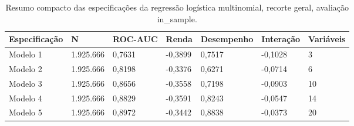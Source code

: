 \begin{table}
\caption{Resumo compacto das especificações da regressão logística multinomial, recorte geral, avaliação in_sample.}
\label{tab:tabela_compacta_logit_ternario_recorte_geral_in_sample}
\begin{tabular}{lllllll}
\toprule
Especificação & N & ROC-AUC & Renda & Desempenho & Interação & Variáveis \\
\midrule
Modelo 1 & 1.925.666 & 0,7631 & -0,3899 & 0,7517 & -0,1028 & 3 \\
Modelo 2 & 1.925.666 & 0,8198 & -0,3376 & 0,6271 & -0,0714 & 6 \\
Modelo 3 & 1.925.666 & 0,8656 & -0,3558 & 0,7198 & -0,0903 & 10 \\
Modelo 4 & 1.925.666 & 0,8829 & -0,3591 & 0,8243 & -0,0547 & 14 \\
Modelo 5 & 1.925.666 & 0,8972 & -0,3442 & 0,8838 & -0,0373 & 20 \\
\bottomrule
\end{tabular}
\end{table}
